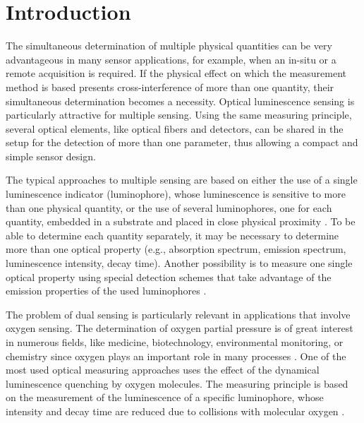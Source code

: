 \documentclass[sensors,article,submit,moreauthors,pdftex,10pt,a4paper]{Definitions/mdpi}
\begin{document}


\section{Introduction}
\label{Introduction}

The simultaneous determination of multiple physical quantities can be very advantageous in many sensor applications, for example, when an in-situ or a remote acquisition is required. 
If the physical effect on which the measurement method is based presents cross-interference of more than one quantity, their simultaneous determination becomes a necessity.
Optical luminescence sensing is particularly attractive for multiple sensing. Using the same measuring principle, several optical elements, like optical fibers and detectors, can be shared in the setup for the detection of more than one parameter, thus allowing a compact and simple sensor design.

The typical approaches to multiple sensing are based on either the use of a single luminescence indicator (luminophore), whose luminescence is sensitive to more than one physical quantity, or the use of several luminophores, one for each quantity, embedded in a substrate and placed in close physical proximity \cite{Stich2010,Borisov2011novel,Kameya2014,Wang2014,Santoro2016,Biring2019}. To be able to determine each quantity separately, it may be necessary to determine more than one optical property (e.g., absorption spectrum, emission spectrum, luminescence intensity, decay time). Another possibility is to measure one single optical property using special detection schemes that take advantage of the emission properties of the used luminophores \cite{Wang2014,Biring2019,Collier2013,Stehning2004,Jorge2008,Moore2006}. 

The problem of dual sensing is particularly relevant in applications that involve oxygen sensing. The determination of oxygen partial pressure is of great interest in numerous fields, like medicine, biotechnology, environmental monitoring, or chemistry since oxygen plays an important role in many processes \cite{Papkovsky2013,Wang2014}. One of the most used optical measuring approaches uses the effect of the dynamical luminescence quenching by oxygen molecules. The measuring principle is based on the measurement of the luminescence of a specific luminophore, whose intensity and decay time are reduced due to collisions with molecular oxygen \cite{Lakowicz2006}.
\end{document}
